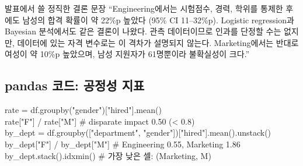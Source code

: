 \documentclass[11pt,a4paper]{article}
\begin{document}
\begin{whybox}{발표에서 쓸 정직한 결론 문장}
``Engineering에서는 시험점수, 경력, 학위를 통제한 후에도 남성의 합격 확률이 약 22\%p 높았다 (95\% CI 11–32\%p). Logistic regression과 Bayesian 분석에서도 같은 결론이 나왔다. 관측 데이터이므로 인과를 단정할 수는 없지만, 데이터에 있는 자격 변수로는 이 격차가 설명되지 않는다. Marketing에서는 반대로 여성이 약 10\%p 높았으며, 남성 지원자가 61명뿐이라 불확실성이 크다.''
\end{whybox}

\subsection*{pandas 코드: 공정성 지표}
\begin{codebox}
rate = df.groupby("gender")["hired"].mean()\\
rate["F"] / rate["M"] \hfill \# disparate impact 0.50 (< 0.8)\\[3pt]
by\_dept = df.groupby(["department", "gender"])["hired"].mean().unstack()\\
by\_dept["F"] / by\_dept["M"] \hfill \# Engineering 0.55, Marketing 1.86\\
by\_dept.stack().idxmin() \hfill \# 가장 낮은 셀: (Marketing, M)
\end{codebox}

\end{document}
